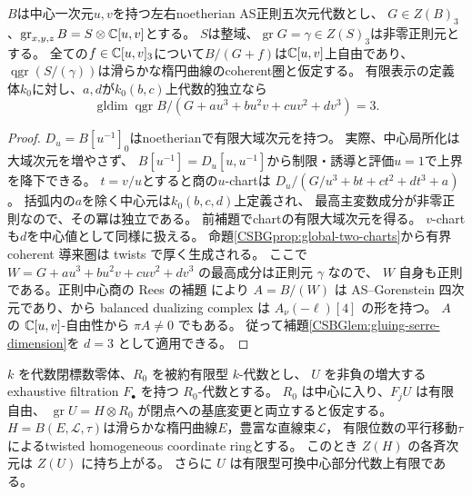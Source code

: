 \begin{theorem}
\label{CSBGthm:global-very-general}
$B$は中心一次元$u,v$を持つ左右noetherian AS正則五次元代数とし、
$G\in Z(B)_3$、$\operatorname{gr}_{x,y,z}B=S\otimes\mathbb C[u,v]$とする。
$S$は整域、$\operatorname{gr}G=\gamma\in Z(S)_3$は非零正則元とする。
全ての$f\in\mathbb C[u,v]_3$について$B/(G+f)$は$\mathbb C[u,v]$上自由であり、
$\operatorname{qgr}(S/(\gamma))$は滑らかな楕円曲線のcoherent圏と仮定する。
有限表示の定義体$k_0$に対し、$a,d$が$k_0(b,c)$上代数的独立なら
\[
 \operatorname{gldim}\operatorname{qgr}
 B/(G+au^3+bu^2v+cuv^2+dv^3)=3.
\]
\end{theorem}
\begin{proof}
$D_u=B[u^{-1}]_0$はnoetherianで有限大域次元を持つ。
実際、中心局所化は大域次元を増やさず、
$B[u^{-1}]=D_u[u,u^{-1}]$から制限・誘導と評価$u=1$で上界を降下できる。
$t=v/u$とすると商の$u$-chartは
$D_u/(G/u^3+bt+ct^2+dt^3+a)$。
括弧内の$a$を除く中心元は$k_0(b,c,d)$上定義され、
最高主変数成分が非零正則なので、その冪は独立である。
前補題でchartの有限大域次元を得る。
$v$-chartも$d$を中心値として同様に扱える。
命題\ref{CSBGprop:global-two-charts}から有界 coherent 導来圏は twists で厚く生成される。
ここで $W=G+au^3+bu^2v+cuv^2+dv^3$ の最高成分は正則元 $\gamma$ なので、
$W$ 自身も正則である。正則中心商の Rees の補題
\cite[arXiv v1, Lemma~4.4(3)]{CSBGCCKM}により $A=B/(W)$ は
AS--Gorenstein 四次元であり、\cite[Corollary~4.3 とその直前]{YZ}から
balanced dualizing complex は $A_\nu(-\ell)[4]$ の形を持つ。
$A$ の $\mathbb C[u,v]$-自由性から $\pi A\ne0$ でもある。
従って補題\ref{CSBGlem:gluing-serre-dimension}を $d=3$ として適用できる。
\end{proof}

\begin{lemma}[被約な係数環上の中心持上げ]
\label{CSBGlem:global-center-lifting}
$k$ を代数閉標数零体、$R_0$ を被約有限型 $k$-代数とし、
$U$ を非負の増大する exhaustive filtration $F_\bullet$ を持つ $R_0$-代数とする。
$R_0$ は中心に入り、$F_jU$ は有限自由、
$\operatorname{gr}U=H\otimes R_0$ が閉点への基底変更と両立すると仮定する。
$H=B(E,\mathcal L,\tau)$は滑らかな楕円曲線$E$，豊富な直線束$\mathcal L$，
有限位数の平行移動$\tau$によるtwisted homogeneous coordinate ringとする。
このとき $Z(H)$ の各斉次元は $Z(U)$ に持ち上がる。
さらに $U$ は有限型可換中心部分代数上有限である。
\end{lemma}

